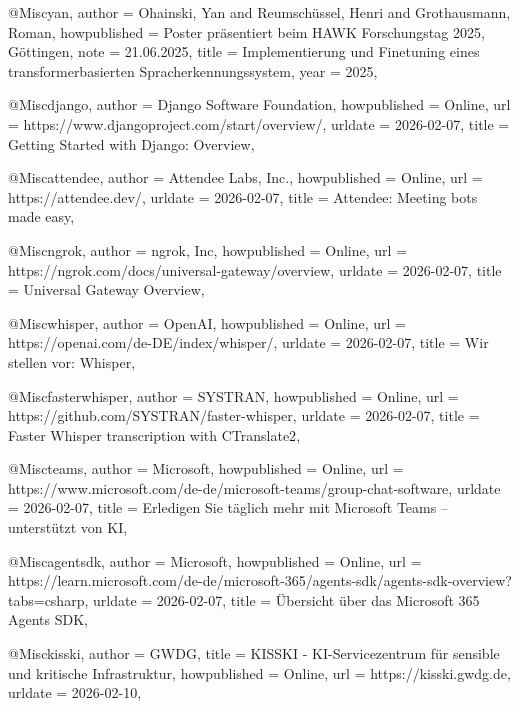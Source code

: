 @Misc{yan,
  author       = {Ohainski, Yan and Reumschüssel, Henri and Grothausmann, Roman},
  howpublished = {Poster präsentiert beim HAWK Forschungstag 2025, Göttingen},
  note         = {21.06.2025},
  title        = {Implementierung und Finetuning eines transformerbasierten Spracherkennungssystem},
  year         = {2025},
}


@Misc{django,
  author       = {{Django Software Foundation}},
  howpublished = {Online},
  url          = {https://www.djangoproject.com/start/overview/},
  urldate      = {2026-02-07},
  title        = {Getting Started with Django: Overview},
}

@Misc{attendee,
  author       = {{Attendee Labs, Inc.}},
  howpublished = {Online},
  url          = {https://attendee.dev/},
  urldate      = {2026-02-07},
  title        = {Attendee: Meeting bots made easy},
}

@Misc{ngrok,
  author       = {{ngrok, Inc}},
  howpublished = {Online},
  url          = {https://ngrok.com/docs/universal-gateway/overview},
  urldate      = {2026-02-07},
  title        = {Universal Gateway Overview},
}

@Misc{whisper,
  author       = {{OpenAI}},
  howpublished = {Online},
  url          = {https://openai.com/de-DE/index/whisper/},
  urldate      = {2026-02-07},
  title        = {Wir stellen vor: Whisper},
}

@Misc{fasterwhisper,
  author       = {{SYSTRAN}},
  howpublished = {Online},
  url          = {https://github.com/SYSTRAN/faster-whisper},
  urldate      = {2026-02-07},
  title        = {Faster Whisper transcription with CTranslate2},
}

@Misc{teams,
  author       = {{Microsoft}},
  howpublished = {Online},
  url          = {https://www.microsoft.com/de-de/microsoft-teams/group-chat-software},
  urldate      = {2026-02-07},
  title        = {Erledigen Sie täglich mehr mit Microsoft Teams – unterstützt von KI},
}

@Misc{agentsdk,
  author       = {{Microsoft}},
  howpublished = {Online},
  url          = {https://learn.microsoft.com/de-de/microsoft-365/agents-sdk/agents-sdk-overview?tabs=csharp},
  urldate      = {2026-02-07},
  title        = {Übersicht über das Microsoft 365 Agents SDK},
}

@Misc{kisski,
  author  = {GWDG},
  title   = {KISSKI - KI-Servicezentrum für sensible und kritische Infrastruktur},
  howpublished = {Online},
  url     = {https://kisski.gwdg.de},
  urldate = {2026-02-10},
}

